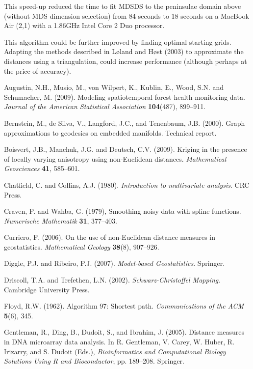 \documentclass[useAMS, referee]{biom}
\begin{document}
This speed-up reduced the time to fit MDSDS to the peninsulae domain above (without MDS dimension selection) from 84 seconds to 18 seconds on a MacBook Air (2,1) with a 1.86GHz Intel Core 2 Duo processor.

This algorithm could be further improved by finding optimal starting grids. Adapting the methods described in L{\o}land and H{\o}st (2003) to approximate the distances using a triangulation, could increase performance (although perhaps at the price of accuracy).

\begin{thebibliography}{99}

\bibitem{} Augustin, N.H., Musio, M., von Wilpert, K., Kublin, E., Wood, S.N. and Schumacher, M. (2009). 
Modeling spatiotemporal forest health monitoring data. \textit{Journal of the American Statistical Association} \textbf{104}(487), 899--911.

\bibitem{} Bernstein, M., de Silva, V., Langford, J.C., and Tenenbaum, J.B. (2000). Graph approximations to geodesics on embedded manifolds. Technical report.

\bibitem{} Boisvert, J.B., Manchuk,  J.G. and Deutsch, C.V. (2009). Kriging in the presence of locally varying anisotropy using non-{E}uclidean distances. \textit{Mathematical Geosciences} \textbf{41}, 585--601.

\bibitem{} Chatfield, C. and Collins, A.J. (1980). \textit{Introduction to multivariate analysis}. CRC Press.

\bibitem{} Craven, P. and Wahba, G. (1979), Smoothing noisy data with spline functions. \textit{Numerische Mathematik} \textbf{31}, 377--403.

\bibitem{} Curriero, F. (2006). On the use of non-{E}uclidean distance measures in geostatistics. \textit{Mathematical Geology} \textbf{38}(8), 907--926.

\bibitem{} Diggle, P.J. and Ribeiro, P.J. (2007). \textit{Model-based Geostatistics}. Springer.

\bibitem{} 	Driscoll, T.A. and Trefethen, L.N. (2002). \textit{Schwarz-Christoffel Mapping}. Cambridge University Press.

\bibitem{} Floyd, R.W. (1962). Algorithm 97: Shortest path. \textit{Communications of the ACM} \textbf{5}(6), 345.

\bibitem{} Gentleman, R., Ding, B., Dudoit, S., and Ibrahim, J. (2005). Distance measures in DNA microarray data analysis. In R. Gentleman, V. Carey, W. Huber, R. Irizarry, and S. Dudoit (Eds.), \textit{Bioinformatics and Computational Biology Solutions Using R and Bioconductor}, pp. 189--208. Springer.


\end{thebibliography}
\end{document}
